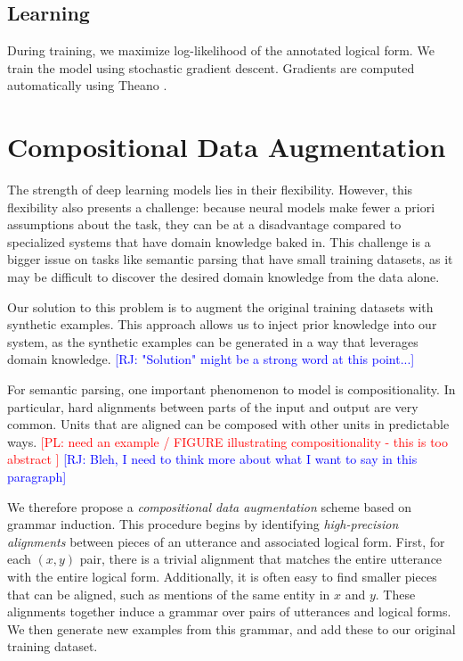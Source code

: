 \documentclass[11pt,letterpaper]{article}
\newcommand\pl[1]{\textcolor{red}{[PL: #1]}}
\newcommand\rj[1]{\textcolor{blue}{[RJ: #1]}}
\begin{document}
\subsection{Learning}
During training, we maximize log-likelihood of the annotated logical form.
We train the model using stochastic gradient descent.
Gradients are computed automatically using Theano \cite{bergstra2010theano}.

\section{Compositional Data Augmentation}
The strength of deep learning models lies in their flexibility.
However, this flexibility also presents a challenge:
because neural models make fewer a priori assumptions about the task,
they can be at a disadvantage compared to specialized systems
that have domain knowledge baked in.
This challenge is a bigger issue on tasks like semantic parsing
that have small training datasets, as
it may be difficult to discover the desired domain knowledge
from the data alone.

Our solution to this problem is to
augment the original training datasets with synthetic examples.
This approach allows us to inject prior knowledge into our system,
as the synthetic examples can be generated 
in a way that leverages domain knowledge.
\rj{"Solution" might be a strong word at this point...}

For semantic parsing, one important phenomenon to model is compositionality.
In particular, hard alignments between parts of the input and output
are very common.  
Units that are aligned can be composed with other units in predictable ways.
\pl{need an example / FIGURE illustrating compositionality - this is too abstract }
\rj{Bleh, I need to think more about what I want to say in this paragraph}

We therefore propose a \emph{compositional data augmentation} scheme
based on grammar induction.
This procedure begins by identifying \emph{high-precision alignments}
between pieces of an utterance and associated logical form.
First, for each $(x, y)$ pair, there is a trivial alignment that
matches the entire utterance with the entire logical form.
Additionally, it is often easy to find smaller pieces that can be aligned,
such as mentions of the same entity in $x$ and $y$.
These alignments together
induce a grammar over pairs of utterances and logical forms.
We then generate new examples from this grammar,
and add these to our original training dataset.
\end{document}
